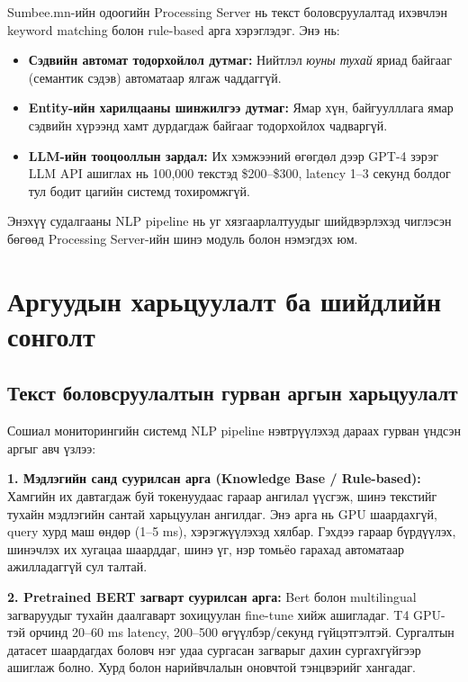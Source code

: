 Sumbee.mn-ийн одоогийн Processing Server нь текст боловсруулалтад ихэвчлэн keyword matching болон rule-based арга хэрэглэдэг. Энэ нь:

\begin{itemize}
    \item \textbf{Сэдвийн автомат тодорхойлол дутмаг:} Нийтлэл \textit{юуны тухай} яриад байгааг (семантик сэдэв) автоматаар ялгаж чаддаггүй.
    \item \textbf{Entity-ийн харилцааны шинжилгээ дутмаг:} Ямар хүн, байгуулллага ямар сэдвийн хүрээнд хамт дурдагдаж байгааг тодорхойлох чадваргүй.
    \item \textbf{LLM-ийн тооцооллын зардал:} Их хэмжээний өгөгдөл дээр GPT-4 зэрэг LLM API ашиглах нь 100,000 текстэд \$200--\$300, latency 1--3 секунд болдог тул бодит цагийн системд тохиромжгүй.
\end{itemize}

Энэхүү судалгааны NLP pipeline нь уг хязгаарлалтуудыг шийдвэрлэхэд чиглэсэн бөгөөд Processing Server-ийн шинэ модуль болон нэмэгдэх юм.

\section{Аргуудын харьцуулалт ба шийдлийн сонголт}

\subsection{Текст боловсруулалтын гурван аргын харьцуулалт}

Сошиал мониторингийн системд NLP pipeline нэвтрүүлэхэд дараах гурван үндсэн аргыг авч үзлээ:

\textbf{1. Мэдлэгийн санд суурилсан арга (Knowledge Base / Rule-based):}
Хамгийн их давтагдаж буй токенуудаас гараар ангилал үүсгэж, шинэ текстийг тухайн мэдлэгийн сантай харьцуулан ангилдаг. Энэ арга нь GPU шаардахгүй, query хурд маш өндөр (1--5 ms), хэрэгжүүлэхэд хялбар. Гэхдээ гараар бүрдүүлэх, шинэчлэх их хугацаа шаарддаг, шинэ үг, нэр томьёо гарахад автоматаар ажилладаггүй сул талтай.

\textbf{2. Pretrained BERT загварт суурилсан арга:}
Bert болон multilingual загваруудыг тухайн даалгаварт зохицуулан fine-tune хийж ашигладаг. T4 GPU-тэй орчинд 20--60 ms latency, 200--500 өгүүлбэр/секунд гүйцэтгэлтэй. Сургалтын датасет шаардагдах боловч нэг удаа сургасан загварыг дахин сургахгүйгээр ашиглаж болно. Хурд болон нарийвчлалын оновчтой тэнцвэрийг хангадаг.

